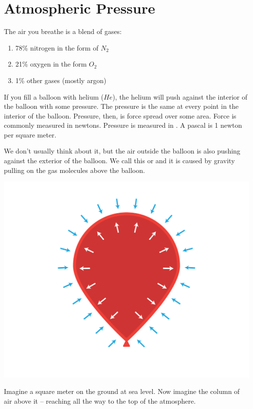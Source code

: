 \chapter{Atmospheric Pressure}

The air you breathe is a blend of gases:
\begin{enumerate}
\item 78\% nitrogen in the form of $N_2$
\item 21\% oxygen in the form $O_2$
\item 1\% other gases (mostly argon)
\end{enumerate}

If you fill a balloon with helium ($He$),  the helium will push against the interior of the balloon with some pressure.   
The pressure is the same at every point in the interior of the balloon.  Pressure,  then,  is force spread over some area.   
Force is commonly measured in newtons.   Pressure is measured in .  A pascal is 1 newton per square meter.

We don't usually think about it,  but the air outside the balloon is also pushing against the exterior of the balloon.  
We call this  or  and it is caused by gravity pulling on the gas molecules above the balloon.

\includegraphics[width=\textwidth]{balloon.png}


Imagine a square meter on the ground at sea level.  Now imagine the column of air above it -- reaching all the way to the top of the atmosphere.

